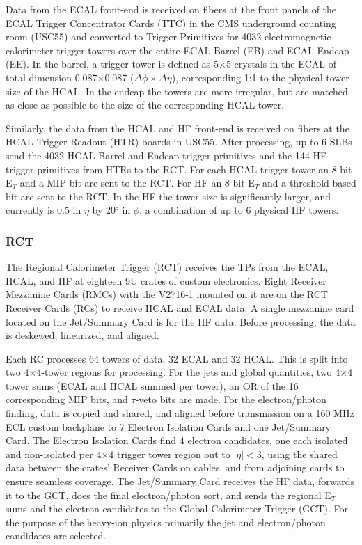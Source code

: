 Data from the ECAL front-end is received on fibers at the front panels 
of the ECAL Trigger Concentrator Cards (TTC) in the CMS underground counting 
room (USC55) and converted to Trigger Primitives for 4032 electromagnetic 
calorimeter trigger towers over the entire ECAL Barrel (EB) and ECAL Endcap 
(EE).  In the barrel, a trigger tower is defined as 5$\times$5 crystals in 
the ECAL of total dimension 0.087$\times$0.087 ($\Delta\phi\times\Delta\eta$), 
corresponding 1:1 to the physical tower size of the HCAL.  In the endcap 
the towers are more irregular, but are matched as close as possible to the 
size of the corresponding HCAL tower.

Similarly, the data from the HCAL and HF front-end is received on fibers at 
the HCAL Trigger Readout (HTR) boards in USC55.  After processing, up to 6 
SLBs send the 4032 HCAL Barrel and Endcap trigger primitives and the 144 HF 
trigger primitives from HTRs to the RCT.  For each HCAL trigger tower an 
8-bit E$_T$ and a MIP bit are sent to the RCT.  For HF an 8-bit E$_T$ and 
a threshold-based bit are sent to the RCT.  In the HF the tower size is 
significantly larger, and currently is 0.5 in $\eta$ by 20$^\circ$ in $\phi$, 
a combination of up to 6 physical HF towers.

\subsubsection{RCT}

The  Regional Calorimeter Trigger (RCT) receives the TPs from the ECAL, HCAL, 
and HF at eighteen 9U crates of custom electronics.  Eight Receiver Mezzanine 
Cards (RMCs) with the V2716-1 mounted on it are on the RCT Receiver Cards 
(RCs) to receive HCAL and ECAL data.  A single mezzanine card located on 
the Jet/Summary Card is for the HF data.  Before processing, the data is 
deskewed, linearized, and aligned. 

Each RC processes 64 towers of data, 32 ECAL and 32 HCAL.  This is split 
into two 4$\times$4-tower regions for processing.  For the jets and global 
quantities, two 4$\times$4 tower sums (ECAL and HCAL summed per tower), an 
OR of the 16 corresponding MIP bits, and $\tau$-veto bits are made. For 
the electron/photon finding,  data is copied and shared, and aligned before 
transmission on a 160 MHz ECL custom backplane to 7 Electron Isolation Cards 
and one Jet/Summary Card.  The Electron Isolation Cards find 4 electron 
candidates,  one each isolated and non-isolated per 4$\times$4 trigger 
tower region out to $|\eta|<3$, using the shared data between the crates' 
Receiver Cards on cables, and from adjoining cards to ensure seamless 
coverage.  The Jet/Summary Card receives the HF data, forwards it to the 
GCT, does the final electron/photon sort, and sends the regional E$_T$ 
sums and the electron candidates to the Global Calorimeter Trigger (GCT).  
For the purpose of the heavy-ion physics primarily the jet and electron/photon candidates are selected.


